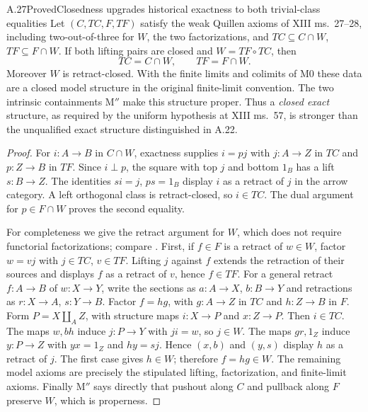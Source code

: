 \begin{claim}{A.27}{Proved}{Closedness upgrades historical exactness to both trivial-class equalities}
Let $(C,TC,F,TF)$ satisfy the weak Quillen axioms of XIII ms.~27--28, including two-out-of-three for $W$, the two factorizations, and $TC\subseteq C\cap W$, $TF\subseteq F\cap W$. If both lifting pairs are closed and $W=TF\circ TC$, then
\[
TC=C\cap W,\qquad TF=F\cap W.
\]
Moreover $W$ is retract-closed. With the finite limits and colimits of M0 these data are a closed model structure in the original finite-limit convention. The two intrinsic containments M$''$ make this structure proper. Thus a \emph{closed exact} structure, as required by the uniform hypothesis at XIII ms.~57, is stronger than the unqualified exact structure distinguished in A.22.
\end{claim}
\begin{proof}
For $i:A\to B$ in $C\cap W$, exactness supplies $i=pj$ with $j:A\to Z$ in $TC$ and $p:Z\to B$ in $TF$. Since $i\perp p$, the square with top $j$ and bottom $1_B$ has a lift $s:B\to Z$. The identities $si=j$, $ps=1_B$ display $i$ as a retract of $j$ in the arrow category. A left orthogonal class is retract-closed, so $i\in TC$. The dual argument for $p\in F\cap W$ proves the second equality.

For completeness we give the retract argument for $W$, which does not require functorial factorizations; compare \citet[Lemma~11.3.3]{BISITERiehl2014}. First, if $f\in F$ is a retract of $w\in W$, factor $w=vj$ with $j\in TC$, $v\in TF$. Lifting $j$ against $f$ extends the retraction of their sources and displays $f$ as a retract of $v$, hence $f\in TF$. For a general retract $f:A\to B$ of $w:X\to Y$, write the sections as $a:A\to X$, $b:B\to Y$ and retractions as $r:X\to A$, $s:Y\to B$. Factor $f=hg$, with $g:A\to Z$ in $TC$ and $h:Z\to B$ in $F$. Form $P=X\amalg_A Z$, with structure maps $i:X\to P$ and $x:Z\to P$. Then $i\in TC$. The maps $w,bh$ induce $j:P\to Y$ with $ji=w$, so $j\in W$. The maps $gr,1_Z$ induce $y:P\to Z$ with $yx=1_Z$ and $hy=sj$. Hence $(x,b)$ and $(y,s)$ display $h$ as a retract of $j$. The first case gives $h\in W$; therefore $f=hg\in W$. The remaining model axioms are precisely the stipulated lifting, factorization, and finite-limit axioms. Finally M$''$ says directly that pushout along $C$ and pullback along $F$ preserve $W$, which is properness.
\end{proof}

